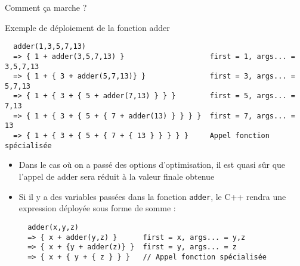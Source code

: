 \documentclass[compress,10pt,aspectratio=169]{beamer}
\begin{document}
\begin{frame}[fragile]{Comment ça marche ?}
\scriptsize 
\begin{block}{Exemple de déploiement de la fonction adder}
\begin{verbatim}
  adder(1,3,5,7,13) 
  => { 1 + adder(3,5,7,13) }                    first = 1, args... = 3,5,7,13
  => { 1 + { 3 + adder(5,7,13)} }               first = 3, args... = 5,7,13
  => { 1 + { 3 + { 5 + adder(7,13) } } }        first = 5, args... = 7,13
  => { 1 + { 3 + { 5 + { 7 + adder(13) } } } }  first = 7, args... = 13
  => { 1 + { 3 + { 5 + { 7 + { 13 } } } } }     Appel fonction spécialisée
\end{verbatim}
\end{block}
\begin{itemize}
  \item Dans le cas où on a passé des options d'optimisation, il est quasi sûr 
        que l'appel de adder sera réduit à la valeur finale obtenue
  \item Si il y a des variables passées dans la fonction \texttt{adder}, le C++
        rendra une expression déployée sous forme de somme :
  \begin{verbatim}
  adder(x,y,z)
  => { x + adder(y,z) }      first = x, args... = y,z
  => { x + {y + adder(z)} }  first = y, args... = z
  => { x + { y + { z } } }   // Appel fonction spécialisée
  \end{verbatim}
\end{itemize}
\end{frame}
\end{document}
